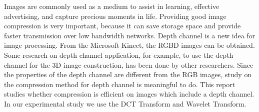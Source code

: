 Images are commonly used as a medium to assist in learning, effective advertising, and capture precious moments in life. Providing good image compression is very important, because it can save storage space and provide faster transmission over low bandwidth networks. Depth channel is a new idea for image processing. From the Microsoft Kinect, the RGBD images can be obtained. Some research on depth channel application, for example, to use the depth channel for the 3D image construction, has been done by other researchers. Since the properties of the depth channel are different from the RGB images, study on the compression method for depth channel is meaningful to do. This report studies whether compression is efficient on images which include a depth channel. In our experimental study we use the DCT Transform and Wavelet Transform.